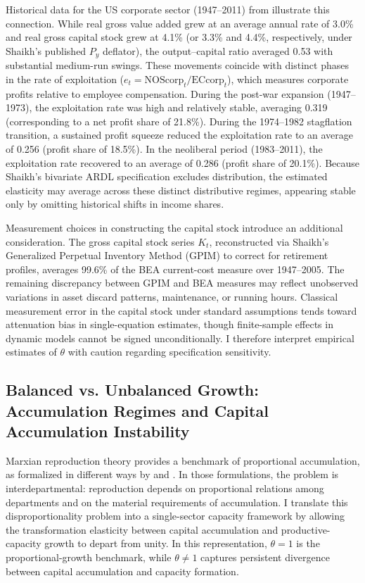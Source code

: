 Historical data for the US corporate sector (1947--2011) from \citet{Shaikh2016} illustrate this connection. While real gross value added grew at an average annual rate of 3.0\% and real gross capital stock grew at 4.1\% (or 3.3\% and 4.4\%, respectively, under Shaikh's published $P_y$ deflator), the output--capital ratio averaged 0.53 with substantial medium-run swings. These movements coincide with distinct phases in the rate of exploitation ($e_t = \text{NOScorp}_t / \text{ECcorp}_t$), which measures corporate profits relative to employee compensation. During the post-war expansion (1947--1973), the exploitation rate was high and relatively stable, averaging 0.319 (corresponding to a net profit share of 21.8\%). During the 1974--1982 stagflation transition, a sustained profit squeeze reduced the exploitation rate to an average of 0.256 (profit share of 18.5\%). In the neoliberal period (1983--2011), the exploitation rate recovered to an average of 0.286 (profit share of 20.1\%). Because Shaikh's bivariate ARDL specification excludes distribution, the estimated elasticity may average across these distinct distributive regimes, appearing stable only by omitting historical shifts in income shares.

Measurement choices in constructing the capital stock introduce an additional consideration. The gross capital stock series $K_t$, reconstructed via Shaikh's Generalized Perpetual Inventory Method (GPIM) to correct for retirement profiles, averages 99.6\% of the BEA current-cost measure over 1947--2005. The remaining discrepancy between GPIM and BEA measures may reflect unobserved variations in asset discard patterns, maintenance, or running hours. Classical measurement error in the capital stock under standard assumptions tends toward attenuation bias in single-equation estimates, though finite-sample effects in dynamic models cannot be signed unconditionally. I therefore interpret empirical estimates of $\theta$ with caution regarding specification sensitivity.

\subsection{Balanced vs. Unbalanced Growth: Accumulation Regimes and Capital Accumulation Instability}
\label{subsec:balanced_unbalanced_growth}

Marxian reproduction theory provides a benchmark of proportional accumulation, as formalized in different ways by \citet{Okishio2022} and \citet{Basu2022}. In those formulations, the problem is interdepartmental: reproduction depends on proportional relations among departments and on the material requirements of accumulation. I translate this disproportionality problem into a single-sector capacity framework by allowing the transformation elasticity between capital accumulation and productive-capacity growth to depart from unity. In this representation, $\theta = 1$ is the proportional-growth benchmark, while $\theta \neq 1$ captures persistent divergence between capital accumulation and capacity formation.

